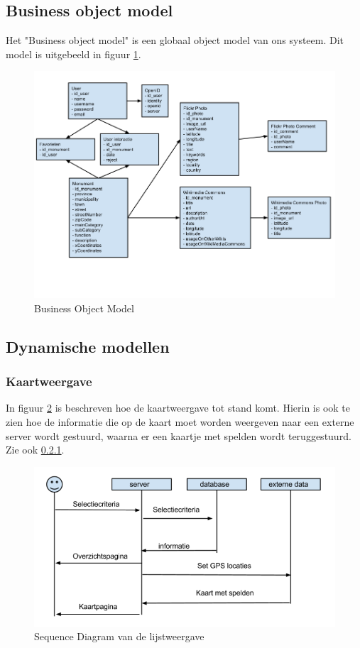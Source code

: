 \documentclass[a4paper,10pt]{article}
\newcommand{\rsubsection}[1]{
\subsection{#1}\label{sec:sub:#1}
}
\newcommand{\rsubsubsection}[1]{
\subsubsection{#1}\label{sec:sub:sub:#1}
}
\begin{document}
\rsubsection{Business object model}
		Het "Business object model" is een globaal object model van ons systeem. Dit model is uitgebeeld in figuur \ref{bom}.
		\begin{figure}[ht!]
			\centering
			\includegraphics[width=\textwidth]{BusinessObjectModel.png}
			\caption{Business Object Model \label{bom}}
		\end{figure}
		\rsubsection{Dynamische modellen}
			\rsubsubsection{Kaartweergave}
			In figuur \ref{sequence1} is beschreven hoe de kaartweergave tot stand komt. Hierin is ook te zien hoe de informatie die op de kaart moet worden weergeven naar een externe server wordt gestuurd, waarna er een kaartje met spelden wordt teruggestuurd. Zie ook \ref{sec:sub:sub:Kaartweergave}.
\begin{figure}[ht!]
				\centering
				\includegraphics[width=\textwidth]{sequence1.png}
				\caption{Sequence Diagram van de lijstweergave \label{sequence1}}
			\end{figure}			
\end{document}
